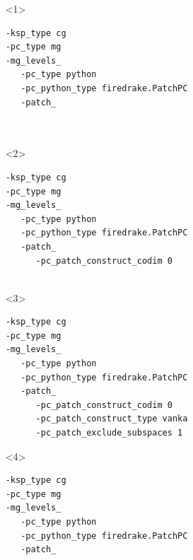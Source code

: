 \documentclass[presentation,aspectratio=43,10pt]{beamer}
\newcommand{\convexpath}[2]{
  [
  create hullcoords/.code={
    \global\edef\namelist{#1}
    \foreach [count=\counter] \nodename in \namelist {
      \global\edef\numberofnodes{\counter}
      \coordinate (hullcoord\counter) at (\nodename);
    }
    \coordinate (hullcoord0) at (hullcoord\numberofnodes);
    \pgfmathtruncatemacro\lastnumber{\numberofnodes+1}
    \coordinate (hullcoord\lastnumber) at (hullcoord1);
  },
  create hullcoords
  ]
  ($(hullcoord1)!#2!-90:(hullcoord0)$)
  \foreach [
  evaluate=\currentnode as \previousnode using \currentnode-1,
  evaluate=\currentnode as \nextnode using \currentnode+1
  ] \currentnode in {1,...,\numberofnodes} {
    let \p1 = ($(hullcoord\currentnode) - (hullcoord\previousnode)$),
    \n1 = {atan2(\y1,\x1) + 90},
    \p2 = ($(hullcoord\nextnode) - (hullcoord\currentnode)$),
    \n2 = {atan2(\y2,\x2) + 90},
    \n{delta} = {Mod(\n2-\n1,360) - 360}
    in
    {arc [start angle=\n1, delta angle=\n{delta}, radius=#2]}
    -- ($(hullcoord\nextnode)!#2!-90:(hullcoord\currentnode)$)
  }
}
\begin{document}
\begin{frame}[fragile]
\begin{columns}
\begin{column}{0.4\textwidth}
\begin{onlyenv}
\begin{center}
        \end{center}
      \end{onlyenv}
    \end{column}
    \begin{column}{0.6\textwidth}
      \begin{onlyenv}<1>
\begin{verbatim}
-ksp_type cg
-pc_type mg
-mg_levels_
   -pc_type python
   -pc_python_type firedrake.PatchPC
   -patch_



\end{verbatim}
      \end{onlyenv}
      \begin{onlyenv}<2>
\begin{verbatim}
-ksp_type cg
-pc_type mg
-mg_levels_
   -pc_type python
   -pc_python_type firedrake.PatchPC
   -patch_
      -pc_patch_construct_codim 0


\end{verbatim}
      \end{onlyenv}
      \begin{onlyenv}<3>
\begin{verbatim}
-ksp_type cg
-pc_type mg
-mg_levels_
   -pc_type python
   -pc_python_type firedrake.PatchPC
   -patch_
      -pc_patch_construct_codim 0
      -pc_patch_construct_type vanka
      -pc_patch_exclude_subspaces 1
\end{verbatim}
      \end{onlyenv}
      \begin{onlyenv}<4>
\begin{verbatim}
-ksp_type cg
-pc_type mg
-mg_levels_
   -pc_type python
   -pc_python_type firedrake.PatchPC
   -patch_




\end{verbatim}
\end{onlyenv}
\end{column}
\end{columns}
\end{frame}
\end{document}
